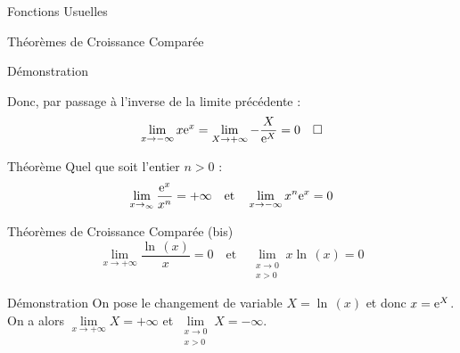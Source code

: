 \documentclass{coursbook}
\begin{document}
\begin{Gpartie}{Fonctions Usuelles}
\begin{Spartie}{Théorèmes de Croissance Comparée}
\begin{SSpartie}{Démonstration}
\begin{itemize}
                    Donc, par passage à l'inverse de la limite précédente : 
                    \[\lim\limits_{x\to-\infty}x\me^x=\lim\limits_{X\to+\infty}-\frac{X}{\me^X}=0\quad\square\]
                \end{itemize}
            \end{SSpartie}
        \end{Spartie}
        \begin{Spartie}{Théorème} 
            Quel que soit l'entier $n>0$ : \[\lim\limits_{x\to_\infty}\frac{\me^x}{x^n}=+\infty\quad\text{et}\quad\lim\limits_{x\to-\infty}x^n\me^x=0\]
        \end{Spartie}
        \begin{Spartie}{Théorèmes de Croissance Comparée (bis)} 
            \[\lim\limits_{x\to+\infty}\frac{\ln\,(x)}{x}=0\quad\text{et}\quad\lim\limits_{\substack{x\to0 \\ x>0}}x\ln\,(x)=0\]
            \begin{SSpartie}{Démonstration} 
                On pose le changement de variable $X=\ln\,(x)$ et donc $x=\mathrm{e}^X$. On a alors $\lim\limits_{x\to+\infty}X=+\infty$ et $\lim\limits_{\substack{x\to0 \\ x>0}}X=-\infty$.
            \end{SSpartie}
        \end{Spartie}
    \end{Gpartie}
\end{document}
